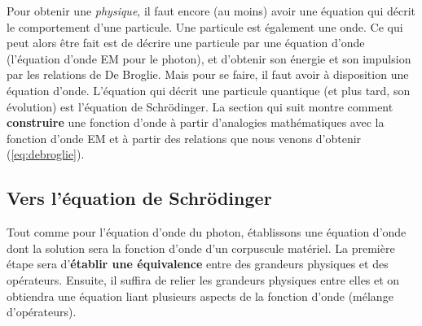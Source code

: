 \documentclass[12pt, a4paper]{book}
\begin{document}
Pour obtenir une \textit{physique}, il faut encore (au moins) avoir une équation qui décrit le comportement d'une particule. Une particule est également une onde. Ce qui peut alors être fait est de décrire une particule par une équation d'onde (l'équation d'onde EM pour le photon), et d'obtenir son énergie et son impulsion par les relations de De Broglie. Mais pour se faire, il faut avoir à disposition une équation d'onde. L'équation qui décrit une particule quantique (et plus tard, son évolution) est l'équation de Schrödinger. La section qui suit montre comment \textbf{construire} une fonction d'onde à partir d'analogies mathématiques avec la fonction d'onde EM et à partir des relations que nous venons d'obtenir (\ref{eq:debroglie}).

\subsection{Vers l'équation de Schrödinger}
Tout comme pour l'équation d'onde du photon, établissons une équation d'onde dont la solution sera la fonction d'onde d'un corpuscule matériel. La première étape sera d'\textbf{établir une équivalence} entre des grandeurs physiques et des opérateurs. Ensuite, il suffira de relier les grandeurs physiques entre elles et on obtiendra une équation liant plusieurs aspects de la fonction d'onde (mélange d'opérateurs).\\
\end{document}
